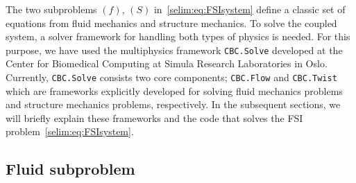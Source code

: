 The two subproblems $(f)$, $(S)$ in~\eqref{selim:eq:FSIsystem} define
a classic set of equations from fluid mechanics and structure
mechanics. To solve the coupled system, a solver framework for
handling both types of physics is needed. For this purpose, we have
used the multiphysics framework \texttt{CBC.Solve} developed at the
Center for Biomedical Computing at Simula Research Laboratories in
Oslo. Currently, \texttt{CBC.Solve} consists two core components;
\texttt{CBC.Flow} and \texttt{CBC.Twist} which are frameworks
explicitly developed for solving fluid mechanics problems and
structure mechanics problems, respectively.  In the subsequent
sections, we will briefly explain these frameworks and the code that
solves the FSI problem~\eqref{selim:eq:FSIsystem}.

\subsection{Fluid subproblem}

